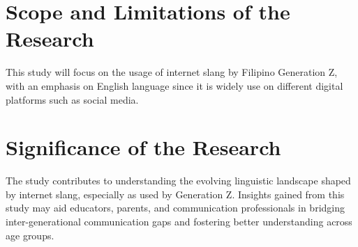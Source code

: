 \section{Scope and Limitations of the Research}
\label{sec:scope}
This study will focus on the usage of internet slang by Filipino Generation Z, with an emphasis on English language since it is widely use on different digital platforms such as social media.

\section{Significance of the Research}
\label{sec:significance}
The study contributes to understanding the evolving linguistic landscape shaped by internet slang, especially as used by Generation Z.
Insights gained from this study may aid educators, parents, and communication professionals in bridging inter-generational communication gaps and fostering better understanding across age groups.

